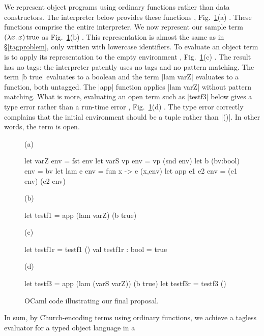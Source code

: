 We represent object programs using ordinary functions rather than
data constructors.  The interpreter below provides these functions%
, Fig.~\ref{fig:tag-final-proposal}(a)%
.
These functions comprise the entire interpreter.
We now represent our sample term $(\mathopen{\lambda\mathord{x}.\,}x)\mathinner{\mathrm{true}}$ as
Fig.~\ref{fig:tag-final-proposal}(b)%
.
This representation is almost the same as in \S\ref{tagproblem}, only
written with lowercase identifiers. To evaluate an object term is to
apply its representation to the empty environment%
, Fig.~\ref{fig:tag-final-proposal}(c)%
.
The result has no tags: the interpreter patently uses no tags and no
pattern matching. The term |b true| evaluates to a boolean and the term
|lam varZ| evaluates to a function, both untagged. The |app| function
applies |lam varZ| without pattern matching. What is more, evaluating an
open term such as |testf3| below gives a type error rather than
a run-time error
, Fig.~\ref{fig:tag-final-proposal}(d)%
.
The type error correctly complains
that the initial environment should be a tuple rather than |()|.
In other words, the term is open.
\begin{figure}
%
(a)\vspace{-10pt}
\begin{code}
let varZ env        = fst env
let varS vp env     = vp (snd env)
let b (bv:bool) env = bv
let lam e env       = fun x -> e (x,env)
let app e1 e2 env   = (e1 env) (e2 env)
\end{code}
%
(b)\vspace{-10pt}
\begin{code}
let testf1 = app (lam varZ) (b true)
\end{code}
%
(c)\vspace{-10pt}
\begin{code}
let testf1r = testf1 ()
val testf1r : bool = true
\end{code}
%
(d)\vspace{-10pt}
\begin{code}
let testf3 = app (lam (varS varZ)) (b true)
let testf3r = testf3 ()
\end{code}
%
\caption{OCaml code illustrating our final proposal.}
\label{fig:tag-final-proposal}
\end{figure}
%
In sum, by Church\hyp encoding terms using ordinary functions, we
achieve a tagless evaluator for a typed object language in a
